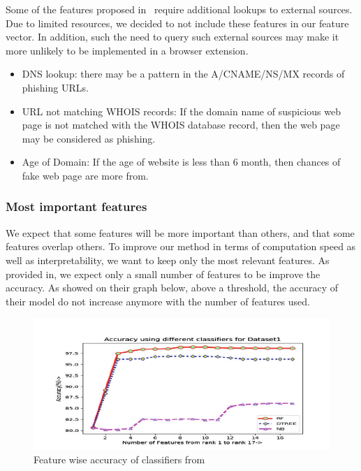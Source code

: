 \documentclass{article}
\begin{document}
    Some of the features proposed in~\cite{PhishSafe} require additional lookups to external sources.
    Due to limited resources, we decided to not include these features in our feature vector.
    In addition, such the need to query such external sources may make it more unlikely to be implemented in a browser extension.
    \begin{itemize}
        \item DNS lookup: there may be a pattern in the A/CNAME/NS/MX records of phishing URLs.
        \item URL not matching WHOIS records: If the domain name of suspicious web page is not matched with the WHOIS database record, then the web page may be considered as phishing.
        \item Age of Domain: If the age of website is less than 6 month, then chances of fake web page are more from.
    \end{itemize}

    \subsubsection{Most important features}

    We expect that some features will be more important than others, and that some features overlap others.
    To improve our method in terms of computation speed as well as interpretability, we want to keep only the most relevant features.
    As provided in\cite{LexicalFeatureSelection}, we expect only a small number of features to be improve the accuracy.
    As showed on their graph below, above a threshold, the accuracy of their model do not increase anymore with the number of features used.

    \begin{figure}[H]
        \centering
        \includegraphics[width=\textwidth]{report_img/lexicalfeatureselectionaccuracygraph}
        \caption{Feature wise accuracy of classifiers from\cite{LexicalFeatureSelection}}
        \label{fig:kEvolution}
    \end{figure}
\end{document}
